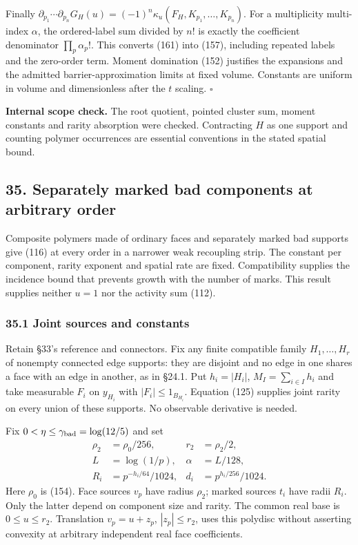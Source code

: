 \documentclass[11pt,a4paper]{article}
\begin{document}
Finally
\(\partial_{p_1}\cdots\partial_{p_n}G_H(u) =(-1)^n\kappa_u(F_H,K_{p_1},\ldots,K_{p_n})\).
For a multiplicity multi-index \(\alpha\), the ordered-label sum divided
by \(n!\) is exactly the coefficient denominator \(\prod_p\alpha_p!\).
This converts (161) into (157), including repeated labels and the
zero-order term. Moment domination (152) justifies the expansions and
the admitted barrier-approximation limits at fixed volume. Constants are
uniform in volume and dimensionless after the \(t\) scaling. \(\square\)

\textbf{Internal scope check.} The root quotient, pointed cluster sum,
moment constants and rarity absorption were checked. Contracting \(H\)
as one support and counting polymer occurrences are essential
conventions in the stated spatial bound.

\hypertarget{separately-marked-bad-components-at-arbitrary-order}{%
\subsection{35. Separately marked bad components at arbitrary
order}\label{separately-marked-bad-components-at-arbitrary-order}}

Composite polymers made of ordinary faces and separately marked bad
supports give (116) at every order in a narrower weak recoupling strip.
The constant per component, rarity exponent and spatial rate are fixed.
Compatibility supplies the incidence bound that prevents growth with the
number of marks. This result supplies neither \(u=1\) nor the activity
sum (112).

\hypertarget{joint-sources-and-constants}{%
\subsubsection{35.1 Joint sources and
constants}\label{joint-sources-and-constants}}

Retain §33's reference and connectors. Fix any finite compatible family
\(H_1,\ldots,H_r\) of nonempty connected edge supports: they are
disjoint and no edge in one shares a face with an edge in another, as in
§24.1. Put \(h_i=|H_i|\), \(M_I=\sum_{i\in I}h_i\) and take measurable
\(F_i\) on \(y_{H_i}\) with \(|F_i|\le1_{B_{H_i}}\). Equation (125)
supplies joint rarity on every union of these supports. No observable
derivative is needed.

Fix \(0<\eta\le\gamma_{\rm bad}=\log(12/5)\) and set \[\begin{aligned}
\rho_2&=\rho_0/256,&r_2&=\rho_2/2,\\
L&=\log(1/p),&\alpha&=L/128,\\
R_i&=p^{-h_i/64}/1024,&d_i&=p^{h_i/256}/1024.
\end{aligned}\tag{162}\] Here \(\rho_0\) is (154). Face sources \(v_p\)
have radius \(\rho_2\); marked sources \(t_i\) have radii \(R_i\). Only
the latter depend on component size and rarity. The common real base is
\(0\le u\le r_2\). Translation \(v_p=u+z_p\), \(|z_p|\le r_2\), uses
this polydisc without asserting convexity at arbitrary independent real
face coefficients.
\end{document}
